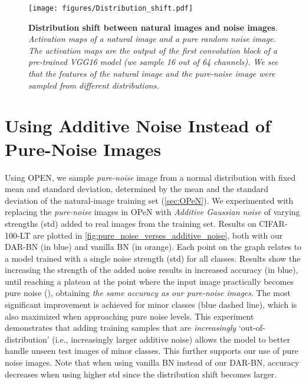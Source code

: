 \documentclass[nohyperref]{article}
\theoremstyle{plain}
\theoremstyle{definition}
\theoremstyle{remark}
\begin{document}
\begin{figure*}
\vspace{-0.3cm}
    \centering
    \begin{minipage}[c]{1\linewidth}
    \texttt{[image: figures/Distribution\_shift.pdf]}
    \end{minipage}
    \vspace{-0.25cm}
    \caption{\textbf{Distribution shift between natural images and noise images}. {\it
    Activation maps of a natural image and a pure random noise image. The activation maps are the output of the first convolution block of a pre-trained VGG16 model (we sample 16 out of 64 channels). We see that the features of the natural image and the pure-noise image were sampled from different distributions.}}\label{fig:distribution_shift_activation_map}
    \vspace{-0.15cm}
\end{figure*}

\section{Using Additive Noise Instead of Pure-Noise Images}
\label{appendix:additive_noise}

Using OPEN, we sample \emph{pure-noise} image from a normal distribution with fixed mean and standard deviation, determined by the mean and the standard deviation of the natural-image training set (\cref{sec:OPeN}). We experimented with replacing the \emph{pure-noise} images in OPeN with \emph{Additive Gaussian noise} of varying strengths (std) added to real images from the training set. Results on CIFAR-100-LT are plotted in \cref{fig:pure_noise_verses_additive_noise}, both with our DAR-BN (in blue) and vanilla BN (in orange). Each point on the graph relates to a model trained with a single noise strength (std) for all classes. Results show the increasing the strength of the added noise results in increased accuracy (in blue), until reaching a plateau at the point where the input image practically becomes pure noise (), obtaining \emph{the same accuracy as our pure-noise images}. The most significant improvement is achieved for minor classes (blue dashed line), which is also maximized when approaching pure noise levels. This experiment demonstrates that adding training samples that are \emph{increasingly} `out-of-distribution' (i.e., increasingly larger additive noise) allows the model to better handle unseen test images of minor classes. This further supports our use of pure noise images. Note that when using vanilla BN instead of our DAR-BN, accuracy decreases when using higher std since the distribution shift becomes larger.
\end{document}

